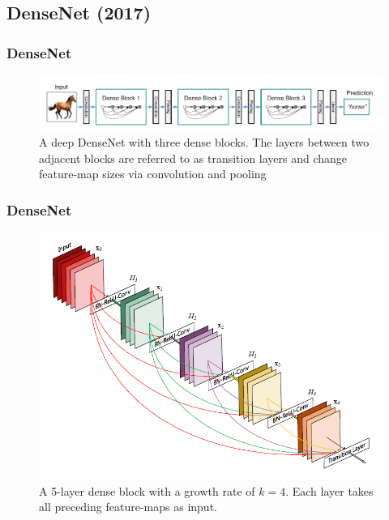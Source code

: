 \subsection{DenseNet (2017)}

\begin{frame}
\frametitle{DenseNet}


\bigskip

\begin{center}
	\begin{figure}
		\includegraphics[scale=0.6]{figs/densenet_scheme2}
		\caption{A deep DenseNet with three dense blocks. The layers between two adjacent blocks are referred to as transition layers and change
		feature-map sizes via convolution and pooling}
	\end{figure}
\end{center}

\end{frame}

\begin{frame}
	\frametitle{DenseNet}

\begin{center}
	\begin{figure}
		\includegraphics[scale=0.7]{figs/densenet_scheme}
		\caption{A 5-layer dense block with a growth rate of $k = 4$.
			Each layer takes all preceding feature-maps as input.}
	\end{figure}

\end{center}
\end{frame}

